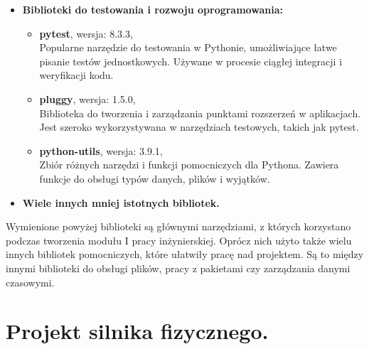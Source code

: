 \begin{itemize}
\begin{itemize}
        \item \textbf{PyOpenGL-accelerate}, wersja: 3.1.7, \\
        Przyspieszenie obliczeń OpenGL w Pythonie poprzez implementację krytycznych operacji w C. Stosowana w aplikacjach wymagających wysokiej wydajności w grafice 3D.

        \item \textbf{pyqtgraph}, wersja: 0.13.7, \\
        Biblioteka do tworzenia dynamicznych wizualizacji danych i wykresów w czasie rzeczywistym. Znajduje zastosowanie w aplikacjach naukowych i inżynieryjnych.
    \end{itemize}
    \item \textbf{Biblioteki do testowania i rozwoju oprogramowania:}
    \begin{itemize}
        \item \textbf{pytest}, wersja: 8.3.3, \\
        Popularne narzędzie do testowania w Pythonie, umożliwiające łatwe pisanie testów jednostkowych. Używane w procesie ciągłej integracji i weryfikacji kodu.

        \item \textbf{pluggy}, wersja: 1.5.0, \\
        Biblioteka do tworzenia i zarządzania punktami rozszerzeń w aplikacjach. Jest szeroko wykorzystywana w narzędziach testowych, takich jak pytest.

        \item \textbf{python-utils}, wersja: 3.9.1, \\
        Zbiór różnych narzędzi i funkcji pomocniczych dla Pythona. Zawiera funkcje do obsługi typów danych, plików i wyjątków.
    \end{itemize}
    \item \textbf{Wiele innych mniej istotnych bibliotek.}
\end{itemize}

Wymienione powyżej biblioteki są głównymi narzędziami, z których korzystano
podczas tworzenia modułu I pracy inżynierskiej. Oprócz nich użyto także
wielu innych bibliotek pomocniczych, które ułatwiły pracę nad projektem. Są
to między innymi biblioteki do obsługi plików, pracy z pakietami czy
zarządzania danymi czasowymi.


\section{Projekt silnika fizycznego.}\label{sec:projekt-silnika-fizycznego.}

